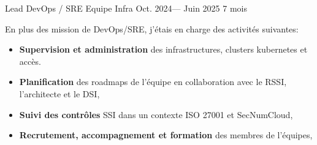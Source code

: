 \jobposition%
{Lead DevOps / SRE}%
{Equipe Infra}%
{Oct. 2024--- Juin 2025}%
{7 mois}%
{
  En plus des mission de DevOps/SRE, j'étais en charge des activités suivantes:
	\begin{itemize}
		\item \textbf{Supervision et administration} des
		      infrastructures, clusters kubernetes et accès.
		\item \textbf{Planification} des roadmaps de l'équipe en collaboration avec
		      le RSSI, l'architecte et le DSI,
		\item \textbf{Suivi des contrôles} SSI dans un contexte ISO 27001 et SecNumCloud,
		\item \textbf{Recrutement, accompagnement et formation} des membres de
		      l'équipes,
	\end{itemize}
}
